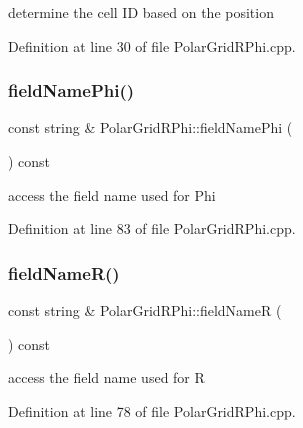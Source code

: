 determine the cell ID based on the position 



Definition at line 30 of file Polar\+Grid\+R\+Phi.\+cpp.

\hypertarget{class_d_d4hep_1_1_geometry_1_1_polar_grid_r_phi_aae955b9e6518f31977913c8f1f25016a}{}\label{class_d_d4hep_1_1_geometry_1_1_polar_grid_r_phi_aae955b9e6518f31977913c8f1f25016a} 
\subsubsection{\texorpdfstring{field\+Name\+Phi()}{fieldNamePhi()}}
{\footnotesize\ttfamily const string \& Polar\+Grid\+R\+Phi\+::field\+Name\+Phi (\begin{DoxyParamCaption}{ }\end{DoxyParamCaption}) const}



access the field name used for Phi 



Definition at line 83 of file Polar\+Grid\+R\+Phi.\+cpp.

\hypertarget{class_d_d4hep_1_1_geometry_1_1_polar_grid_r_phi_aeb6135457952d23b9033cc1537d76376}{}\label{class_d_d4hep_1_1_geometry_1_1_polar_grid_r_phi_aeb6135457952d23b9033cc1537d76376} 
\subsubsection{\texorpdfstring{field\+Name\+R()}{fieldNameR()}}
{\footnotesize\ttfamily const string \& Polar\+Grid\+R\+Phi\+::field\+NameR (\begin{DoxyParamCaption}{ }\end{DoxyParamCaption}) const}



access the field name used for R 



Definition at line 78 of file Polar\+Grid\+R\+Phi.\+cpp.


